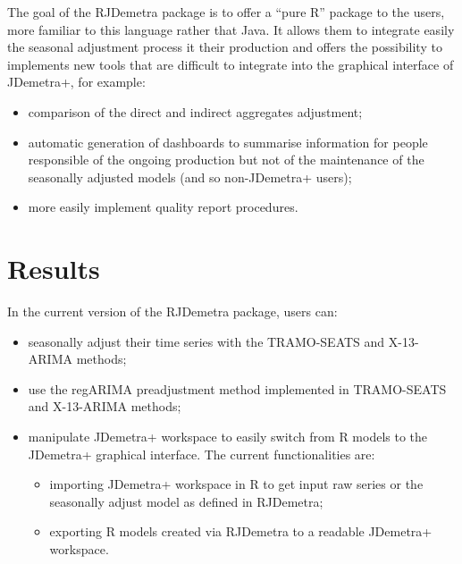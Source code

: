 \documentclass[]{article}
\providecommand{\tightlist}{%
  \setlength{\itemsep}{0pt}\setlength{\parskip}{0pt}}
\begin{document}
The goal of the RJDemetra package is to offer a ``pure R'' package to
the users, more familiar to this language rather that Java. It allows
them to integrate easily the seasonal adjustment process it their
production and offers the possibility to implements new tools that are
difficult to integrate into the graphical interface of JDemetra+, for
example:

\begin{itemize}
\tightlist
\item
  comparison of the direct and indirect aggregates adjustment;\\
\item
  automatic generation of dashboards to summarise information for people
  responsible of the ongoing production but not of the maintenance of
  the seasonally adjusted models (and so non-JDemetra+ users);\\
\item
  more easily implement quality report procedures.
\end{itemize}

\section{Results}\label{results}

In the current version of the RJDemetra package, users can:

\begin{itemize}
\tightlist
\item
  seasonally adjust their time series with the TRAMO-SEATS and
  X-13-ARIMA methods;\\
\item
  use the regARIMA preadjustment method implemented in TRAMO-SEATS and
  X-13-ARIMA methods;\\
\item
  manipulate JDemetra+ workspace to easily switch from R models to the
  JDemetra+ graphical interface. The current functionalities are:

  \begin{itemize}
  \tightlist
  \item
    importing JDemetra+ workspace in R to get input raw series or the
    seasonally adjust model as defined in RJDemetra;
  \item
    exporting R models created via RJDemetra to a readable JDemetra+
    workspace.
  \end{itemize}
\end{itemize}
\end{document}

